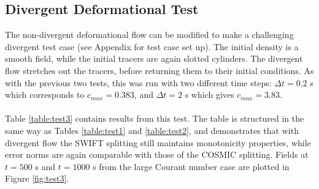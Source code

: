 \documentclass[11pt,a4paper]{article}
\begin{document}
\subsection{Divergent Deformational Test} \label{sec:test3}

The non-divergent deformational flow can be modified to make a challenging divergent test case (see Appendix for test case set up). The initial density is a smooth field, while the initial tracers are again slotted cylinders. The divergent flow stretches out the tracers, before returning them to their initial conditions.
As with the previous two tests, this was run with two different time steps: $\Delta t=0.2$ s which corresponds to $c_{max}=0.383$, and $\Delta t=2$ s which gives $c_{max}=3.83$. \\
\\
Table \ref{table:test3} contains results from this test.
The table is structured in the same way as Tables \ref{table:test1} and \ref{table:test2}, and demonstrates that with divergent flow the SWIFT splitting still maintains monotonicity properties, while error norms are again comparable with those of the COSMIC splitting.
Fields at $t=500$ s and $t=1000$ s from the large Courant number case are plotted in Figure \ref{fig:test3}. \\
\end{document}
